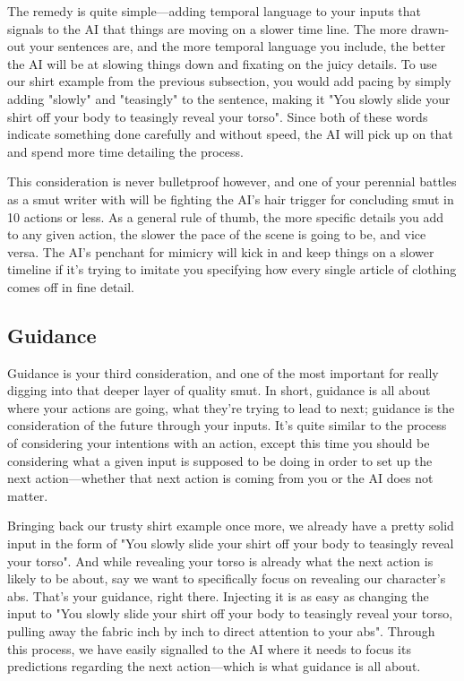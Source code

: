 ﻿\documentclass[Coomer-main.tex]{subfiles}
\begin{document}
The remedy is quite simple—adding temporal language to your inputs that signals to the AI that things are moving on a slower time line.
The more drawn-out your sentences are, and the more temporal language you include, the better the AI will be at slowing things down and fixating on the juicy details.
To use our shirt example from the previous subsection, you would add pacing by simply adding "slowly" and "teasingly" to the sentence, making it "You slowly slide your shirt off your body to teasingly reveal your torso".
Since both of these words indicate something done carefully and without speed, the AI will pick up on that and spend more time detailing the process.

This consideration is never bulletproof however, and one of your perennial battles as a smut writer with \aid will be fighting the AI's hair trigger for concluding smut in 10 actions or less.
As a general rule of thumb, the more specific details you add to any given action, the slower the pace of the scene is going to be, and vice versa.
The AI’s penchant for mimicry will kick in and keep things on a slower timeline if it’s trying to imitate you specifying how every single article of clothing comes off in fine detail.

\subsection{Guidance}

Guidance is your third consideration, and one of the most important for really digging into that deeper layer of quality smut.
In short, guidance is all about where your actions are going, what they’re trying to lead to next; guidance is the consideration of the future through your inputs.
It's quite similar to the process of considering your intentions with an action, except this time you should be considering what a given input is supposed to be doing in order to set up the next action—whether that next action is coming from you or the AI does not matter.


Bringing back our trusty shirt example once more, we already have a pretty solid input in the form of "You slowly slide your shirt off your body to teasingly reveal your torso".
And while revealing your torso is already what the next action is likely to be about, say we want to specifically focus on revealing our character's abs.
That's your guidance, right there.
Injecting it is as easy as changing the input to "You slowly slide your shirt off your body to teasingly reveal your torso, pulling away the fabric inch by inch to direct attention to your abs".
Through this process, we have easily signalled to the AI where it needs to focus its predictions regarding the next action—which is what guidance is all about.
\end{document}
